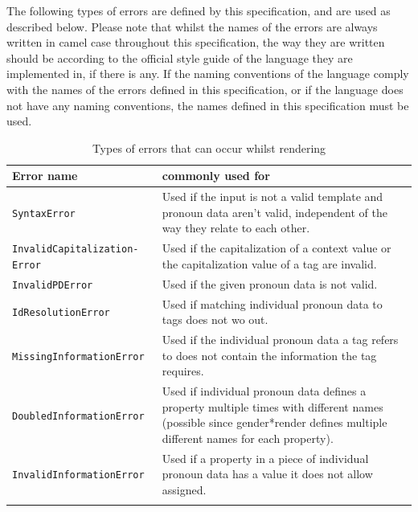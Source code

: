 \documentclass{article}
\newcommand{\GenderRender}{
    gender*render
}
\begin{document}
    The following types of errors are defined by this specification, and are used as described below.
    Please note that whilst the names of the errors are always written in camel case throughout this specification, the way they are written should be according to the official style guide of the language they are implemented in, if there is any.
    If the naming conventions of the language comply with the names of the errors defined in this specification, or if the language does not have any naming conventions, the names defined in this specification must be used.

    \begin{flushleft}
        \begin{center}
            \begin{longtable}{|>{\raggedright\arraybackslash}p{13em} | >{\raggedright\arraybackslash}p{19em} |}
                 \hline
                 Error name & commonly used for \\
                 \hline\hline
                 \texttt{SyntaxError} & Used if the input is not a valid template and pronoun data aren't valid, independent of the way they relate to each other. \\
                 \hline
                 \texttt{InvalidCapitalization- Error} & Used if the capitalization of a context value or the capitalization value of a tag are invalid. \\
                 \hline
                 \texttt{InvalidPDError} & Used if the given pronoun data is not valid. \\
                 \hline
                 \texttt{IdResolutionError} & Used if matching individual pronoun data to tags does not wo out.\\
                 \hline
                 \texttt{MissingInformationError} & Used if the individual pronoun data a tag refers to does not contain the information the tag requires.\\
                 \hline
                 \texttt{DoubledInformationError} & Used if individual pronoun data defines a property multiple times with different names (possible since \GenderRender defines multiple different names for each property). \\
                 \hline
                 \texttt{InvalidInformationError} & Used if a property in a piece of individual pronoun data has a value it does not allow assigned. \\
                 \hline
                \caption{Types of errors that can occur whilst rendering}
            \end{longtable}
        \end{center}
    \end{flushleft}
\end{document}
